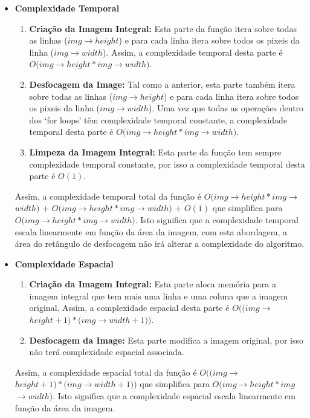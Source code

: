 \begin{itemize}
    
\item
\textbf{Complexidade Temporal}

\begin{enumerate}
    \item \textbf{Criação da Imagem Integral:} Esta parte da função itera sobre todas as linhas ($img$$\rightarrow$$height$) e para cada linha itera sobre todos os pixeis da linha ($img$$\rightarrow$$width$). Assim, a complexidade temporal desta parte é $O(img$$\rightarrow$$height * img$$\rightarrow$$width)$.
    \item \textbf{Desfocagem da Image:} Tal como a anterior, esta parte também itera sobre todas as linhas ($img$$\rightarrow$$height$) e para cada linha itera sobre todos os pixeis da linha ($img$$\rightarrow$$width$). Uma vez que todas as operações dentro dos `for loops' têm complexidade temporal constante, a complexidade temporal desta parte é $O(img$$\rightarrow$$height * img$$\rightarrow$$width)$.
    \item \textbf{Limpeza da Imagem Integral:} Esta parte da função tem sempre complexidade temporal constante, por isso a complexidade temporal desta parte é $O(1)$.
\end{enumerate}

Assim, a complexidade temporal total da função é $O(img$$\rightarrow$$height * img$$\rightarrow$$width)$ + $O(img$$\rightarrow$$height * img$$\rightarrow$$width)$ + $O(1)$ que simplifica para $O(img$$\rightarrow$$height * img$$\rightarrow$$width)$. Isto significa que a complexidade temporal escala linearmente em função da área da imagem, com esta abordagem, a área do retângulo de desfocagem não irá alterar a complexidade do algoritmo.

\item
\textbf{Complexidade Espacial}

\begin{enumerate}
    \item \textbf{Criação da Imagem Integral:} Esta parte aloca memória para a imagem integral que tem mais uma linha e uma coluna que a imagem original. Assim, a complexidade espacial desta parte é $O((img$$\rightarrow$$height + 1) * (img$$\rightarrow$$width + 1))$.
    \item \textbf{Desfocagem da Image:} Esta parte modifica a imagem original, por isso não terá complexidade espacial associada.
\end{enumerate}

Assim, a complexidade espacial total da função é $O((img$$\rightarrow$$height + 1) * (img$$\rightarrow$$width + 1))$ que simplifica para $O(img$$\rightarrow$$height * img$$\rightarrow$$width)$. Isto significa que a complexidade espacial escala linearmente em função da área da imagem.

\end{itemize}
